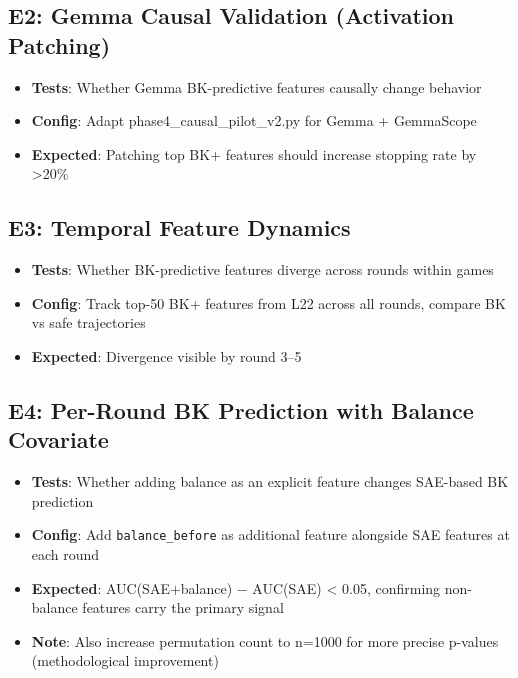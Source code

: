 \documentclass[11pt,a4paper]{article}
\begin{document}
\subsection{E2: Gemma Causal Validation (Activation Patching)}
\begin{itemize}
\item \textbf{Tests}: Whether Gemma BK-predictive features causally change behavior
\end{itemize}
\begin{itemize}
\item \textbf{Config}: Adapt phase4_causal_pilot_v2.py for Gemma + GemmaScope
\end{itemize}
\begin{itemize}
\item \textbf{Expected}: Patching top BK+ features should increase stopping rate by >20\%
\end{itemize}

\subsection{E3: Temporal Feature Dynamics}
\begin{itemize}
\item \textbf{Tests}: Whether BK-predictive features diverge across rounds within games
\end{itemize}
\begin{itemize}
\item \textbf{Config}: Track top-50 BK+ features from L22 across all rounds, compare BK vs safe trajectories
\end{itemize}
\begin{itemize}
\item \textbf{Expected}: Divergence visible by round 3–5
\end{itemize}

\subsection{E4: Per-Round BK Prediction with Balance Covariate}
\begin{itemize}
\item \textbf{Tests}: Whether adding balance as an explicit feature changes SAE-based BK prediction
\end{itemize}
\begin{itemize}
\item \textbf{Config}: Add \texttt{balance_before} as additional feature alongside SAE features at each round
\end{itemize}
\begin{itemize}
\item \textbf{Expected}: AUC(SAE+balance) − AUC(SAE) < 0.05, confirming non-balance features carry the primary signal
\end{itemize}
\begin{itemize}
\item \textbf{Note}: Also increase permutation count to n=1000 for more precise p-values (methodological improvement)
\end{itemize}
\end{document}
